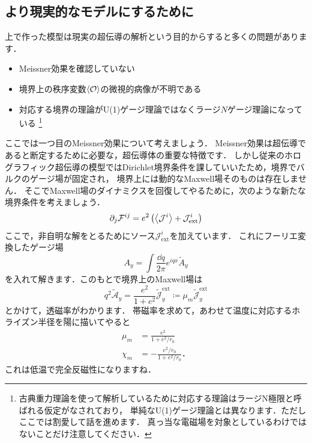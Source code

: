 \documentclass[b5paper,11pt,dvipdfmx]{jsarticle}
\numberwithin{equation}{section}
\theoremstyle{definition}
\begin{document}
\subsection{より現実的なモデルにするために}
上で作った模型は現実の超伝導の解析という目的からすると多くの問題があります．
\begin{itemize}
    \item Meissner効果を確認していない
    \item 境界上の秩序変数$\ev{\mathcal{O}}$の微視的病像が不明である
    \item 対応する境界の理論がU(1)ゲージ理論ではなくラージ$N$ゲージ理論になっている
    \footnote{古典重力理論を使って解析しているために対応する理論はラージN極限と呼ばれる仮定がなされており，
    単純なU(1)ゲージ理論とは異なります．ただしここでは割愛して話を進めます．
    真っ当な電磁場を対象としているわけではないことだけ注意してください．}
\end{itemize}
ここでは一つ目のMeissner効果について考えましょう．
Meissner効果は超伝導であると断定するために必要な，超伝導体の重要な特徴です．
しかし従来のホログラフィック超伝導の模型ではDirichlet境界条件を課していいたため，境界でバルクのゲージ場が固定され，
境界上には動的なMaxwell場そのものは存在しません．
そこでMaxwell場のダイナミクスを回復してやるために，次のような新たな境界条件を考えましょう．
\begin{equation}
    \partial_{j} \mathcal{F}^{ij}
    = e^{2} \left( \ev{\mathcal{J}^{i}} + \mathcal{J}_{\text{ext}}^i \right)
\end{equation}
ここで，非自明な解をとるためにソース$\mathcal{J}_{\text{ext}}^i$を加えています．
これにフーリエ変換したゲージ場
\begin{equation}
    A_y = \int \frac{\dd q}{2 \pi} e^{iqx} \tilde{A}_y
\end{equation}
を入れて解きます．このもとで境界上のMaxwell場は
\begin{equation}
    q^2 \tilde{\mathcal{A}}_y
    = \frac{e^2}{1 + e^2} \tilde{\mathcal{J}}^{\text{ext}}_y
    \coloneq \mu_m \tilde{\mathcal{J}}^{\text{ext}}_y
\end{equation}
とかけて，透磁率がわかります．
帯磁率を求めて，あわせて温度に対応するホライズン半径を陽に描いてやると
\begin{equation}
    \begin{split}
            \mu_m
            &= \frac{e^2}{1 + e^2 / r_0}\\
            \chi_m
            &= - \frac{e^2 / r_0}{1 + e^2 / r_0}．
    \end{split}
\end{equation}
これは低温で完全反磁性になりますね．
\end{document}
